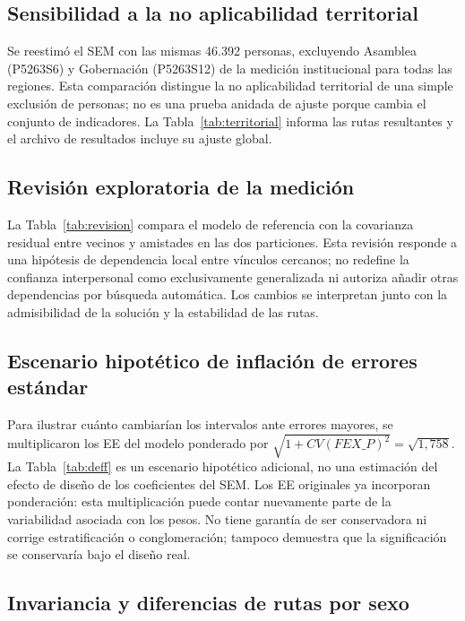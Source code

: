 \documentclass[11pt,letterpaper]{article}
\begin{document}
\subsection{Sensibilidad a la no aplicabilidad territorial}
Se reestimó el SEM con las mismas 46.392 personas, excluyendo Asamblea (P5263S6) y Gobernación (P5263S12) de la medición institucional para todas las regiones. Esta comparación distingue la no aplicabilidad territorial de una simple exclusión de personas; no es una prueba anidada de ajuste porque cambia el conjunto de indicadores. La Tabla~\ref{tab:territorial} informa las rutas resultantes y el archivo de resultados incluye su ajuste global.



\subsection{Revisión exploratoria de la medición}
La Tabla~\ref{tab:revision} compara el modelo de referencia con la covarianza residual entre vecinos y amistades en las dos particiones. Esta revisión responde a una hipótesis de dependencia local entre vínculos cercanos; no redefine la confianza interpersonal como exclusivamente generalizada ni autoriza añadir otras dependencias por búsqueda automática. Los cambios se interpretan junto con la admisibilidad de la solución y la estabilidad de las rutas.



\subsection{Escenario hipotético de inflación de errores estándar}
Para ilustrar cuánto cambiarían los intervalos ante errores mayores, se multiplicaron los EE del modelo ponderado por $\sqrt{1+CV(FEX\_P)^2}=\sqrt{1{,}758}$. La Tabla~\ref{tab:deff} es un escenario hipotético adicional, no una estimación del efecto de diseño de los coeficientes del SEM. Los EE originales ya incorporan ponderación: esta multiplicación puede contar nuevamente parte de la variabilidad asociada con los pesos. No tiene garantía de ser conservadora ni corrige estratificación o conglomeración; tampoco demuestra que la significación se conservaría bajo el diseño real.


\subsection{Invariancia y diferencias de rutas por sexo}
\end{document}
